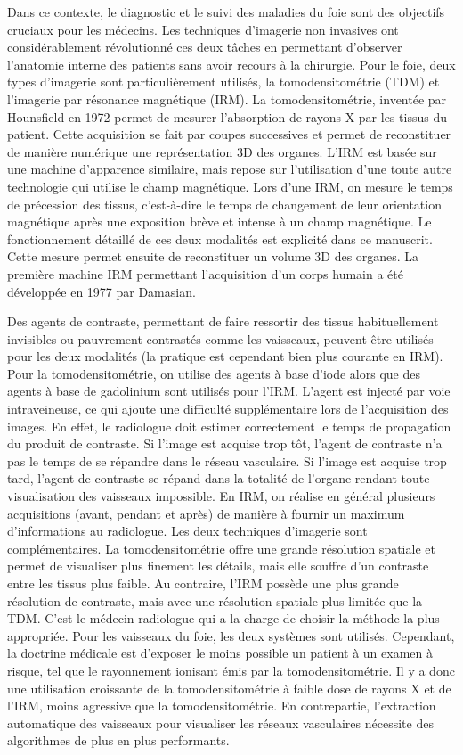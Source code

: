 Dans ce contexte, le diagnostic et le suivi des maladies du foie sont des objectifs cruciaux pour les médecins. Les techniques d'imagerie non invasives ont considérablement révolutionné ces deux tâches en permettant d'observer l'anatomie interne des patients sans avoir recours à la chirurgie. Pour le foie, deux types d'imagerie sont particulièrement utilisés, la tomodensitométrie (TDM) et l'imagerie par résonance magnétique (IRM). La tomodensitométrie, inventée par Hounsfield en 1972 permet de mesurer l'absorption de rayons X par les tissus du patient. Cette acquisition se fait par coupes successives et permet de reconstituer de manière numérique une représentation 3D des organes. L'IRM est basée sur une machine d'apparence similaire, mais repose sur l'utilisation d'une toute autre technologie qui utilise le champ magnétique. Lors d'une IRM, on mesure le temps de précession des tissus, c'est-à-dire le temps de changement de leur orientation magnétique après une exposition brève et intense à un champ magnétique. Le fonctionnement détaillé de ces deux modalités est explicité dans ce manuscrit. Cette mesure permet ensuite de reconstituer un volume 3D des organes. La première machine IRM permettant l'acquisition d'un corps humain a été développée en 1977 par Damasian. 

Des agents de contraste, permettant de faire ressortir des tissus habituellement invisibles ou pauvrement contrastés comme les vaisseaux, peuvent être utilisés pour les deux modalités (la pratique est cependant bien plus courante en IRM). Pour la tomodensitométrie, on utilise des agents à base d'iode alors que des agents à base de gadolinium sont utilisés pour l'IRM. L'agent est injecté par voie intraveineuse, ce qui ajoute une difficulté supplémentaire lors de l'acquisition des images. En effet, le radiologue doit estimer correctement le temps de propagation du produit de contraste. Si l'image est acquise trop tôt, l'agent de contraste n'a pas le temps de se répandre dans le réseau vasculaire. Si l'image est acquise trop tard, l'agent de contraste se répand dans la totalité de l'organe rendant toute visualisation des vaisseaux impossible. En IRM, on réalise en général plusieurs acquisitions (avant, pendant et après) de manière à fournir un maximum d'informations au radiologue.
Les deux techniques d'imagerie sont complémentaires. La tomodensitométrie offre une grande résolution spatiale et permet de visualiser plus finement les détails, mais elle souffre d'un contraste entre les tissus plus faible. Au contraire, l'IRM possède une plus grande résolution de contraste, mais avec une résolution spatiale plus limitée que la TDM. C'est le médecin radiologue qui a la charge de choisir la méthode la plus appropriée. Pour les vaisseaux du foie, les deux systèmes sont utilisés. Cependant, la doctrine médicale est d'exposer le moins possible un patient à un examen à risque, tel que le rayonnement ionisant émis par la tomodensitométrie. Il y a donc une utilisation croissante de la tomodensitométrie à faible dose de rayons X et de l'IRM, moins agressive que la tomodensitométrie. En contrepartie, l'extraction automatique des vaisseaux pour visualiser les réseaux vasculaires nécessite des algorithmes de plus en plus performants.


